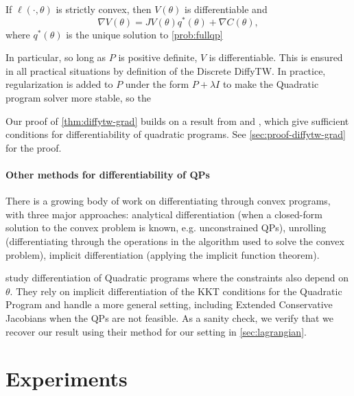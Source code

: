 \begin{theorem}\label{thm:diffytw-grad}
    If $\ell(\cdot, \theta)$ is strictly convex, then $V(\theta)$ is differentiable and
    \begin{equation}
        \nabla V(\theta) = JV(\theta)q^*(\theta) + \nabla C(\theta),
    \end{equation} where $q^*(\theta)$ is the unique solution to \cref{prob:fullqp}
\end{theorem}

In particular, so long as $P$ is positive definite, $V$ is differentiable. This is ensured in all practical situations by definition of the Discrete DiffyTW. In practice, regularization is added to $P$ under the form $P + \lambda I$ to make the Quadratic program solver more stable, so the

Our proof of \cref{thm:diffytw-grad} builds on a result from \cite{shapiro} and \cite{lee}, which give sufficient conditions for differentiability of quadratic programs. See \cref{sec:proof-diffytw-grad} for the proof.

\paragraph{Other methods for differentiability of QPs}
There is a growing body of work on differentiating through convex programs, with three major approaches: analytical differentiation (when a closed-form solution to the convex problem is known, e.g. unconstrained QPs), unrolling (differentiating through the operations in the algorithm used to solve the convex problem), implicit differentiation (applying the implicit function theorem).

\begin{remark}
    \cite{bambade,optnet,...} study differentiation of Quadratic programs where the constraints also depend on $\theta$. They rely on implicit differentiation of the KKT conditions for the Quadratic Program and handle a more general setting, including Extended Conservative Jacobians when the QPs are not feasible. As a sanity check, we verify that we recover our result using their method for our setting in \cref{sec:lagrangian}.
\end{remark}

\section{Experiments}

